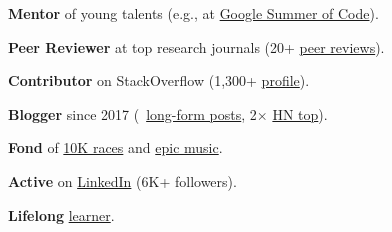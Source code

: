 \documentclass{files/CV/cesar}
\begin{document}
\textbf{Mentor} of young talents (e.g., at \href{https://summerofcode.withgoogle.com/archive/2021/projects/6679675211874304}{Google Summer of Code}).

\textbf{Peer Reviewer} at top research journals (20+ \href{https://www.cesarsotovalero.net/service#academic-reviewer}{peer reviews}).

\textbf{Contributor} on StackOverflow (1,300+ \href{https://stackoverflow.com/users/10480869/cesarsotovalero}{profile}).

\textbf{Blogger} since 2017 (\blogposts~\href{https://www.cesarsotovalero.net/blog}{long-form posts}, 2$\times$ \href{https://news.ycombinator.com/favorites?id=cesarsotovalero}{HN top}).

\textbf{Fond} of \href{https://www.cesarsotovalero.net/races.html}{10K races} and \href{https://open.spotify.com/playlist/1E4xBA3IYuTjtTphOV16FM}{epic music}.

\textbf{Active} on \href{https://www.cesarsotovalero.net/linkedin}{LinkedIn} (6K+ followers).

\textbf{Lifelong} \href{https://www.cesarsotovalero.net/courses.html}{learner}.
\end{document}

